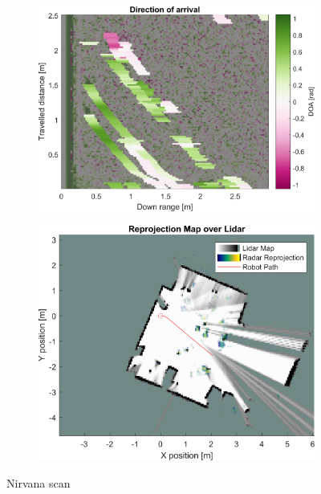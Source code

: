 \begin{figure}[htbp]
\begin{subfigure}[t]{0.475\linewidth}
        \includegraphics[width=\linewidth,max height=.475\textheight]{gfx/results/nirvana_doa.png}
    \end{subfigure}%
    \hfill%
    \begin{subfigure}[t]{0.475\linewidth}
        \centering
        \includegraphics[width=\linewidth,max height=.475\textheight]{gfx/results/nirvana_map.png}
    \end{subfigure}%
    \caption{Nirvana scan}
\end{figure}

